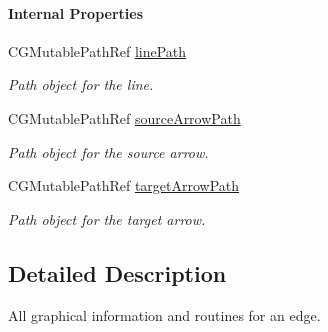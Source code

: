 \begin{Indent}\paragraph*{Internal Properties}
\begin{DoxyCompactItemize}
\item 
\hypertarget{interface_p_c_graph_edge_aa154330493a791e0d7a7b3a4d694f1f9}{
CGMutablePathRef \hyperlink{interface_p_c_graph_edge_aa154330493a791e0d7a7b3a4d694f1f9}{linePath}}
\label{interface_p_c_graph_edge_aa154330493a791e0d7a7b3a4d694f1f9}

\begin{DoxyCompactList}\small\item\em Path object for the line. \end{DoxyCompactList}\item 
\hypertarget{interface_p_c_graph_edge_a30411c3933066eb32a4ec845240f81b1}{
CGMutablePathRef \hyperlink{interface_p_c_graph_edge_a30411c3933066eb32a4ec845240f81b1}{sourceArrowPath}}
\label{interface_p_c_graph_edge_a30411c3933066eb32a4ec845240f81b1}

\begin{DoxyCompactList}\small\item\em Path object for the source arrow. \end{DoxyCompactList}\item 
\hypertarget{interface_p_c_graph_edge_ade6876427887f909994e4620d5136dee}{
CGMutablePathRef \hyperlink{interface_p_c_graph_edge_ade6876427887f909994e4620d5136dee}{targetArrowPath}}
\label{interface_p_c_graph_edge_ade6876427887f909994e4620d5136dee}

\begin{DoxyCompactList}\small\item\em Path object for the target arrow. \end{DoxyCompactList}\end{DoxyCompactItemize}
\end{Indent}


\subsection{Detailed Description}
All graphical information and routines for an edge. 

